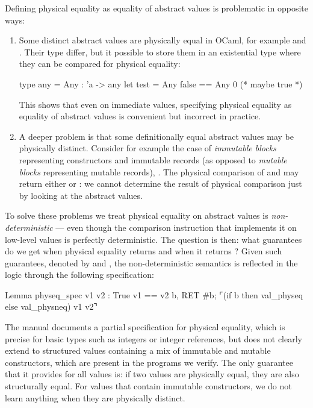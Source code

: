 Defining physical equality as \Rocq equality of abstract values is problematic in opposite ways:
\begin{enumerate}
\item Some distinct abstract values are physically equal in OCaml, for example  and . Their type differ, but it possible to store them in an existential type where they can be compared for physical equality:
\begin{ocamlcode}
type any = Any : 'a -> any
let test = Any false == Any 0 (* maybe true *)
\end{ocamlcode}
This shows that even on immediate values, specifying physical equality as equality of abstract values is convenient but incorrect in practice.

\item A deeper problem is that some definitionally equal abstract values may be physically distinct.
  Consider for example the case of \emph{immutable blocks} representing constructors and immutable records (as opposed to \emph{mutable blocks} representing mutable records), \eg {}.
  The physical comparison of  and  may return either  or : we cannot determine the result of physical comparison just by looking at the abstract values.
\end{enumerate}

To solve these problems we treat physical equality on abstract values is \emph{non-deterministic} --- even though the comparison instruction that implements it on low-level values is perfectly deterministic.
The question is then: what guarantees do we get when physical equality returns  and when it returns ?
Given such guarantees, denoted by  and , the non-deterministic semantics is reflected in the logic through the following specification:

\begin{coqcode}
Lemma physeq_spec v1 v2 :
  {{{ True }}}
    v1 == v2
  {{{ b, RET #b; ⌜(if b then val_physeq else val_physneq) v1 v2⌝ }}}
\end{coqcode}

 The \OCaml manual documents a partial specification for physical equality, which is precise for basic types such as integers or integer references, but does not clearly extend to structured values containing a mix of immutable and mutable constructors, which are present in the programs we verify.
The only guarantee that it provides for all values is: if two values are physically equal, they are also structurally equal. For values that contain immutable constructors, we do not learn anything when they are physically distinct.

